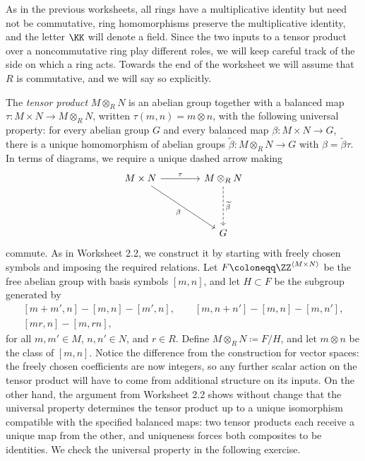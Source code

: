 \documentclass[12pt,reqno]{amsart}
\begin{document}
As in the previous worksheets, all rings have a multiplicative identity but need not be commutative, ring homomorphisms preserve the multiplicative identity, and the letter $\KK$ will denote a field. Since the two inputs to a tensor product over a noncommutative ring play different roles, we will keep careful track of the side on which a ring acts. Towards the end of the worksheet we will assume that $R$ is commutative, and we will say so explicitly.

The \emph{tensor product} $M\otimes_RN$ is an abelian group together with a balanced map $\tau:M\times N\to M\otimes_RN$, written $\tau(m,n)=m\otimes n$, with the following universal property: for every abelian group $G$ and every balanced map $\beta:M\times N\to G$, there is a unique homomorphism of abelian groups $\widetilde\beta:M\otimes_RN\to G$ with $\beta=\widetilde\beta\tau$. In terms of diagrams, we require a unique dashed arrow making
\[
\begin{tikzcd}[row sep=4em,column sep=4em]
M\times N \arrow[r,"\tau"] \arrow[dr,"\beta"'] & M\otimes_RN \arrow[d,dashed,"\widetilde\beta"]\\
& G
\end{tikzcd}
\]
commute. As in Worksheet 2.2, we construct it by starting with freely chosen symbols and imposing the required relations. Let $F\coloneqq\ZZ^{\langle M\times N\rangle}$ be the free abelian group with basis symbols $[m,n]$, and let $H\subset F$ be the subgroup generated by
\[
\begin{gathered}
[m+m',n]-[m,n]-[m',n],\qquad[m,n+n']-[m,n]-[m,n'],\\
[mr,n]-[m,rn],
\end{gathered}
\]
for all $m,m'\in M$, $n,n'\in N$, and $r\in R$. Define $M\otimes_RN\coloneqq F/H$, and let $m\otimes n$ be the class of $[m,n]$. Notice the difference from the construction for vector spaces: the freely chosen coefficients are now integers, so any further scalar action on the tensor product will have to come from additional structure on its inputs. On the other hand, the argument from Worksheet 2.2 shows without change that the universal property determines the tensor product up to a unique isomorphism compatible with the specified balanced maps: two tensor products each receive a unique map from the other, and uniqueness forces both composites to be identities. We check the universal property in the following exercise.

\hrulefill
\end{document}
